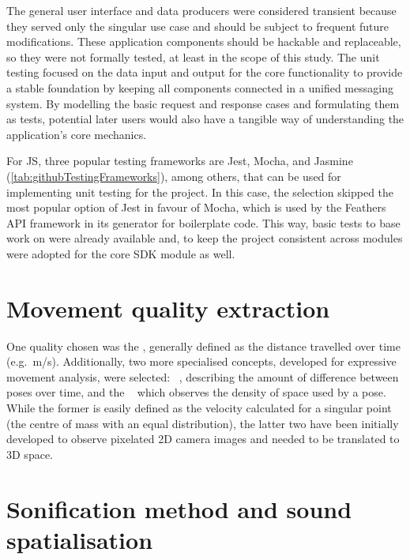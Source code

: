 The general user interface and data producers were considered transient because they served only the singular use case and should be subject to frequent future modifications.
These application components should be hackable and replaceable, so they were not formally tested, at least in the scope of this study.
The unit testing focused on the data input and output for the core functionality to provide a stable foundation by keeping all components connected in a unified messaging system.
By modelling the basic request and response cases and formulating them as tests, potential later users would also have a tangible way of understanding the application's core mechanics.

For \ac{JS}, three popular testing frameworks are Jest, Mocha, and Jasmine (\ref{tab:githubTestingFrameworks}), among others, that can be used for implementing unit testing for the project.
In this case, the selection skipped the most popular option of Jest in favour of Mocha, which is used by the Feathers \ac{API} framework in its generator for boilerplate code.
This way, basic tests to base work on were already available and, to keep the project consistent across modules were adopted for the core \ac{SDK} module as well.



\section{Movement quality extraction}
\label{sec:movement-quality-extraction}

One quality chosen was the , generally defined as the distance travelled over time (e.g.\ m/s).
Additionally, two more specialised concepts, developed for expressive movement analysis, were selected: ~\parencite[96-97]{movementQualities}, describing the amount of difference between poses over time, and the ~\parencite[97]{movementQualities} which observes the density of space used by a pose.
While the former is easily defined as the velocity calculated for a singular point (the centre of mass with an equal distribution), the latter two have been initially developed to observe pixelated \ac{2D} camera images and needed to be translated to \ac{3D} space.

\section{Sonification method and sound spatialisation}
\label{sec:sonification-method-and-sound-spatialisation}

